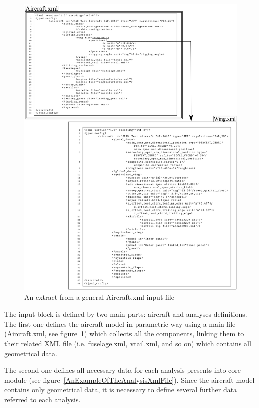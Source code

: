 \begin{figure}[htbp] 
\centering
\includegraphics[width=\textwidth]{Immagini/Capitolo1/1_3-AnExtractFromAGeneralAircraftXmlInputFile}
\caption[Extract from general Aircraft.xml input file] {An extract from a general Aircraft.xml input file}
\label{AnExtractFromAGeneralAircraftXmlInputFile}
\end{figure}

The input block is defined by two main parts: aircraft and analyses definitions. The first one defines the aircraft model in parametric way using a main file (Aircraft.xml, see figure~\ref{AnExtractFromAGeneralAircraftXmlInputFile}) which collects all the components, linking them to their related XML file (i.e. fuselage.xml, vtail.xml, and so on) which contains all geometrical data.

The second one defines all necessary data for each analysis presents into core module (see figure~\ref{AnExampleOfTheAnalysisXmlFile}). Since the aircraft model contains only geometrical data, it is necessary to define several further data referred to each analysis. \\

